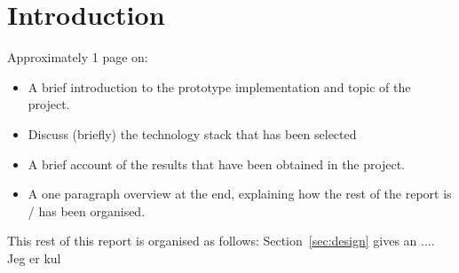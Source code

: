 \section{Introduction}
\label{sec:introduction}

Approximately 1 page on:

\begin{itemize}

\item A brief introduction to the prototype implementation and topic of the project.

\item Discuss (briefly) the technology stack that has been selected

\item A brief account of the results that have been obtained in the project.

\item A one paragraph overview at the end, explaining how the rest of the report is / has been organised.

\end{itemize}

\noindent
This rest of this report is organised as follows:
Section~\ref{sec:design} gives an ....
Jeg er kul